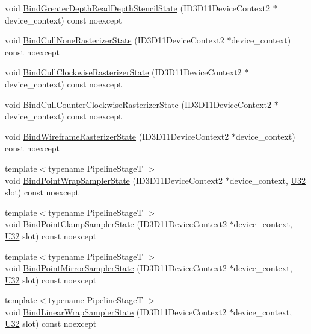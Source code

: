 \begin{DoxyCompactItemize}
\item 
void \hyperlink{classmage_1_1_rendering_state_manager_ab30d4cf090cb2f340da158a79014917c}{Bind\+Greater\+Depth\+Read\+Depth\+Stencil\+State} (I\+D3\+D11\+Device\+Context2 $\ast$device\+\_\+context) const noexcept
\item 
void \hyperlink{classmage_1_1_rendering_state_manager_ace3ec89a7bb648e82eab293901ba22c5}{Bind\+Cull\+None\+Rasterizer\+State} (I\+D3\+D11\+Device\+Context2 $\ast$device\+\_\+context) const noexcept
\item 
void \hyperlink{classmage_1_1_rendering_state_manager_ae51ba156f6e55d905fd15f755c465032}{Bind\+Cull\+Clockwise\+Rasterizer\+State} (I\+D3\+D11\+Device\+Context2 $\ast$device\+\_\+context) const noexcept
\item 
void \hyperlink{classmage_1_1_rendering_state_manager_ab1f026a97dcdad02229387e26bac77f3}{Bind\+Cull\+Counter\+Clockwise\+Rasterizer\+State} (I\+D3\+D11\+Device\+Context2 $\ast$device\+\_\+context) const noexcept
\item 
void \hyperlink{classmage_1_1_rendering_state_manager_a385628cb8e03d0364ae8c6495268db75}{Bind\+Wireframe\+Rasterizer\+State} (I\+D3\+D11\+Device\+Context2 $\ast$device\+\_\+context) const noexcept
\item 
{\footnotesize template$<$typename Pipeline\+StageT $>$ }\\void \hyperlink{classmage_1_1_rendering_state_manager_a9c8c1dce175decd6951efb1d5a71252a}{Bind\+Point\+Wrap\+Sampler\+State} (I\+D3\+D11\+Device\+Context2 $\ast$device\+\_\+context, \hyperlink{namespacemage_a41c104c036fba3756a74e19f793eeaa1}{U32} slot) const noexcept
\item 
{\footnotesize template$<$typename Pipeline\+StageT $>$ }\\void \hyperlink{classmage_1_1_rendering_state_manager_a00f4cb4619ae451e6012c6e1eccfc70c}{Bind\+Point\+Clamp\+Sampler\+State} (I\+D3\+D11\+Device\+Context2 $\ast$device\+\_\+context, \hyperlink{namespacemage_a41c104c036fba3756a74e19f793eeaa1}{U32} slot) const noexcept
\item 
{\footnotesize template$<$typename Pipeline\+StageT $>$ }\\void \hyperlink{classmage_1_1_rendering_state_manager_a02dcbc197b55d6b1811ba976feeb7ede}{Bind\+Point\+Mirror\+Sampler\+State} (I\+D3\+D11\+Device\+Context2 $\ast$device\+\_\+context, \hyperlink{namespacemage_a41c104c036fba3756a74e19f793eeaa1}{U32} slot) const noexcept
\item 
{\footnotesize template$<$typename Pipeline\+StageT $>$ }\\void \hyperlink{classmage_1_1_rendering_state_manager_a0140d7246b0f25d51dd7a987edbefc50}{Bind\+Linear\+Wrap\+Sampler\+State} (I\+D3\+D11\+Device\+Context2 $\ast$device\+\_\+context, \hyperlink{namespacemage_a41c104c036fba3756a74e19f793eeaa1}{U32} slot) const noexcept

\end{DoxyCompactItemize}
